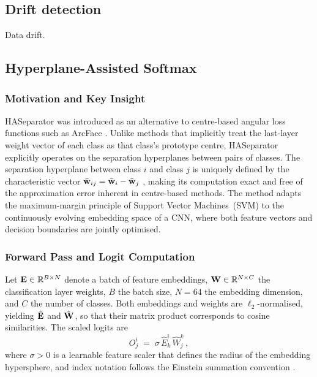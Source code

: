 
\subsection{Drift detection}
\label{sec:bg:drift}

Data drift.



\subsection{Hyperplane-Assisted Softmax}
\label{sec:bg:has}


\subsubsection{Motivation and Key Insight}

HASeparator \cite{kansizoglou-santavas-etal:2020} was introduced as an
alternative to centre-based angular loss functions such as ArcFace
\cite{deng-jiankang-etal:2019}. Unlike methods that implicitly treat the last-layer
weight vector of each class as that class's prototype centre, HASeparator
explicitly operates on the separation hyperplanes between pairs
of classes.
The separation hyperplane between class $i$ and class $j$ is uniquely
defined by the characteristic vector
$\bar{\mathbf{w}}_{ij} = \bar{\mathbf{w}}_i - \bar{\mathbf{w}}_j$
\cite{kansizoglou-bampis-gasteratos:2022}, making its computation exact and
free of the approximation error inherent in centre-based methods.
The method adapts the maximum-margin principle of Support Vector
Machines~(SVM) \cite{cortes-vapnik:1995} to the continuously evolving
embedding space of a CNN, where both feature vectors and decision
boundaries are jointly optimised.

\subsubsection{Forward Pass and Logit Computation}

Let $\mathbf{E} \in \mathbb{R}^{B \times N}$ denote a batch of feature embeddings,
$\mathbf{W} \in \mathbb{R}^{N \times C}$ the classification layer weights,
$B$ the batch size, $N = 64$ the embedding dimension, and
$C$ the number of classes.
Both embeddings and weights are $\ell_2$-normalised, yielding
$\hat{\mathbf{E}}$ and $\hat{\mathbf{W}}$, so that their matrix product corresponds
to cosine similarities.
The scaled logits are
\begin{equation}
  O^i_j \;=\; \sigma\,\hat{E}^i_k\,\hat{W}^k_j \,,
  \label{eq:logits}
\end{equation}
where $\sigma > 0$ is a learnable feature scaler that defines the
radius of the embedding hypersphere, and index notation follows the
Einstein summation convention \cite{kansizoglou-santavas-etal:2020}.

